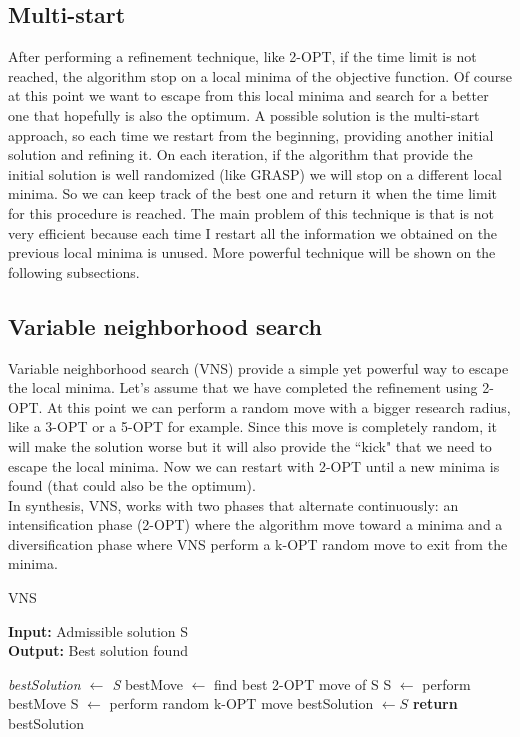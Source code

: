 \subsection{Multi-start}
After performing a refinement technique, like 2-OPT, if the time limit is not reached, the algorithm stop on a local minima of the objective function. Of course at this point we want to escape from this local minima and search for a better one that hopefully is also the optimum. A possible solution is the multi-start approach, so each time we restart from the beginning, providing another initial solution and refining it. On each iteration, if the algorithm that provide the initial solution is well randomized (like GRASP) we will stop on a different local minima. So we can keep track of the best one and return it when the time limit for this procedure is reached.
The main problem of this technique is that is not very efficient because each time I restart all the information we obtained on the previous local minima is unused.
More powerful technique will be shown on the following subsections.

\subsection{Variable neighborhood search}
Variable neighborhood search (VNS) provide a simple yet powerful way to escape the local minima. Let's assume that we have completed the refinement using 2-OPT. At this point we can perform a random move with a bigger research radius, like a 3-OPT or a 5-OPT for example. Since this move is completely random, it will make the solution worse but it will also provide the ``kick" that we need to escape the local minima. Now we can restart with 2-OPT until a new minima is found (that could also be the optimum).\\
In synthesis, VNS, works with two phases that alternate continuously: an intensification  phase (2-OPT) where the algorithm move toward a minima and a diversification phase where VNS perform a k-OPT random move to exit from the minima.

\begin{algorithm}
	\caption{VNS}\label{VNS method}
	\hspace*{\algorithmicindent} \textbf{Input:} Admissible solution S \\
	\hspace*{\algorithmicindent} \textbf{Output:} Best solution found
    \begin{algorithmic}[1]
    		\State \textit{bestSolution $\leftarrow$ S}
			\State bestMove $\leftarrow$ find best 2-OPT move of S
				\State S $\leftarrow$ perform bestMove
			\Else
				\State S $\leftarrow$ perform random k-OPT move
			\EndIf
				\State bestSolution $\leftarrow S$
			\EndIf
		\EndWhile
		\State \textbf{return} bestSolution
    \end{algorithmic}
\end{algorithm}

